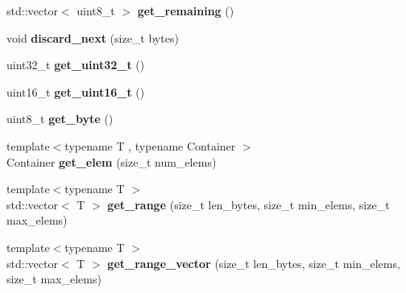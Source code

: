 \begin{DoxyCompactItemize}
std\+::vector$<$ uint8\+\_\+t $>$ {\bfseries get\+\_\+remaining} ()
\item 
\mbox{\label{class_botan_1_1_t_l_s_1_1_t_l_s___data___reader_a237a3ca35b42b66f4e43363d0e666f74}} 
void {\bfseries discard\+\_\+next} (size\+\_\+t bytes)
\item 
\mbox{\label{class_botan_1_1_t_l_s_1_1_t_l_s___data___reader_adbdacfce57a050a2727ceb47383b9c23}} 
uint32\+\_\+t {\bfseries get\+\_\+uint32\+\_\+t} ()
\item 
\mbox{\label{class_botan_1_1_t_l_s_1_1_t_l_s___data___reader_ad65ee94c4324b898bda33fbb2e9d5a7b}} 
uint16\+\_\+t {\bfseries get\+\_\+uint16\+\_\+t} ()
\item 
\mbox{\label{class_botan_1_1_t_l_s_1_1_t_l_s___data___reader_a882e65dac23cde74e35abbf51e7d6ee8}} 
uint8\+\_\+t {\bfseries get\+\_\+byte} ()
\item 
\mbox{\label{class_botan_1_1_t_l_s_1_1_t_l_s___data___reader_a6a1f88eb1af2169956deef9fbe1f3391}} 
{\footnotesize template$<$typename T , typename Container $>$ }\\Container {\bfseries get\+\_\+elem} (size\+\_\+t num\+\_\+elems)
\item 
\mbox{\label{class_botan_1_1_t_l_s_1_1_t_l_s___data___reader_ae1e66a9809134db568ebb95fc9297982}} 
{\footnotesize template$<$typename T $>$ }\\std\+::vector$<$ T $>$ {\bfseries get\+\_\+range} (size\+\_\+t len\+\_\+bytes, size\+\_\+t min\+\_\+elems, size\+\_\+t max\+\_\+elems)
\item 
\mbox{\label{class_botan_1_1_t_l_s_1_1_t_l_s___data___reader_aa1812db126b6da0710b2d28b9cc35728}} 
{\footnotesize template$<$typename T $>$ }\\std\+::vector$<$ T $>$ {\bfseries get\+\_\+range\+\_\+vector} (size\+\_\+t len\+\_\+bytes, size\+\_\+t min\+\_\+elems, size\+\_\+t max\+\_\+elems)
\item 

\end{DoxyCompactItemize}
